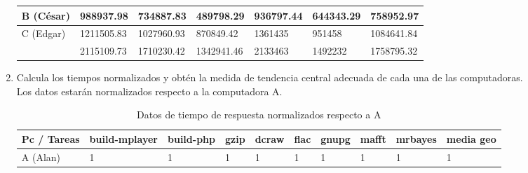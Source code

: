 \documentclass{article}
\begin{document}
\begin{enumerate}
{\begin{itemize}
{\begin{table}[]
\begin{tabular}{|l|l|l|l|l|l|l|}
                            \cellcolor[HTML]{FFFE65}{\color[HTML]{000000}}
                            B (César) & 988937.98 & 734887.83 & 489798.29 
                            & 936797.44 & 644343.29 & 758952.97\\ \hline
            
                            \cellcolor[HTML]{34FF34}{\color[HTML]{000000}} 
                            C (Edgar) & 1211505.83 & 1027960.93 & 870849.42 
                            & 1361435 & 951458 & 1084641.84\\ \hline
            
                            \cellcolor[HTML]{9698ED}{\color[HTML]{000000} 
                            D(Sandra)} & 2115109.73 & 1710230.42 & 1342941.46 
                            & 2133463 & 1492232 & 1758795.32 \\ \hline
                        \end{tabular}
                    \end{table} 
                }
            \end{itemize}
            
        }
        \item {
            Calcula los tiempos normalizados y obtén la medida de tendencia 
            central adecuada de cada una de las computadoras. \\
            Los datos estarán normalizados respecto a la computadora A.

            \begin{table}[]
                \caption*{Datos de tiempo de respuesta normalizados respecto a A}
                \begin{tabular}{|l|l|l|l|l|l|l|l|l|l|}
                \toprule
                Pc / Tareas 
                & \cellcolor[HTML]{DAE8FC}build-mplayer 
                & \cellcolor[HTML]{DAE8FC}build-php 
                & \cellcolor[HTML]{DAE8FC}gzip 
                & \cellcolor[HTML]{DAE8FC}dcraw  
                & \cellcolor[HTML]{DAE8FC}flac 
                & \cellcolor[HTML]{DAE8FC}gnupg 
                & \cellcolor[HTML]{DAE8FC}mafft 
                & \cellcolor[HTML]{DAE8FC}mrbayes 
                & \cellcolor[HTML]{DAE8FC}media geo \\ \hline
    
                \cellcolor[HTML]{F8A102}{\color[HTML]{000000}} 
                A (Alan) & 1 & 1 & 1 & 1 & 1 & 1 & 1 & 1 & 1 \\ \hline
    

\end{tabular}
\end{table}}
\end{enumerate}
\end{document}
